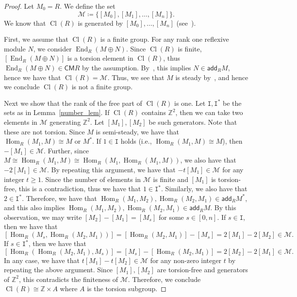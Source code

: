 \documentclass[ALCO,ThmDefs,Unicode]{cedram}
\newcommand{\calM}{\mathcal{M}}
\newcommand{\ZZ}{\mathbb{Z}}
\newcommand{\ttI}{\mathtt{I}}
\DeclareMathOperator{\Hom}{Hom}
\DeclareMathOperator{\Cl}{Cl}
\DeclareMathOperator{\End}{End}
\newcommand{\add}{\mathsf{add}}
\newcommand{\CM}{\mathsf{CM}}
\newcommand*{\MK}{\mkern 2mu}
\begin{document}
\begin{proof}
Let $M_0=R$. We define the set
\[
\calM\coloneqq\{  [M_0], [M_1],\dots, [M_n] \}.
\]
We know that $\Cl(R)$ is generated by $[M_0],\dots,[M_n]$ (see~\cite[Proposition~2.8$\MK$(a)]{IN}).

First, we assume that $\Cl(R)$ is a finite group. For any rank one reflexive module $N$, we consider $\End_R(M\oplus N)$. Since $\Cl(R)$ is finite, $[\End_R(M\oplus N)]$ is a torsion element in $\Cl(R)$, thus $\End_R(M\oplus N)\in\CM R$ by the assumption. By~\cite[Proposition~4.5]{IW2}, this implies $N\in\add_RM$, hence we have that $\Cl(R)=\calM$. Thus, we see that $M$ is steady by~\cite[Theorem~3.1]{IN}, and hence we conclude $\Cl(R)$ is not a finite group.

Next we show that the rank of the free part of $\Cl(R)$ is one. Let $\ttI, \ttI^*$ be the sets as in Lemma~\ref{number_lem}. If $\Cl(R)$ contains $\ZZ^2$, then we can take two elements in $\calM$ generating $\ZZ^2$. Let $[M_1], [M_2]$ be such generators. Note that these are not torsion. Since $M$ is semi-steady, we have that $\Hom_R(M_1,M)\cong M$ or $M^*$. If $1\in\ttI$ holds (i.e., $\Hom_R(M_1,M)\cong M$), then $-[M_1]\in\calM$. Further, since $M\cong\Hom_R(M_1,M)\cong\Hom_R(M_1,\Hom_R(M_1,M))$, we also have that $-2[M_1]\in\calM$. By repeating this argument, we have that $-t[M_1]\in\calM$ for any integer $t\ge 1$. Since the number of elements in $\calM$ is finite and $[M_1]$ is torsion-free, this is a contradiction, thus we have that $1\in\ttI^*$. Similarly, we also have that $2\in\ttI^*$. Therefore, we have that $\Hom_R(M_1,M_2), \Hom_R(M_2,M_1)\in\add_RM^*$, and this also implies $\Hom_R(M_1,M_2), \Hom_R(M_2,M_1)\in\add_RM$. By this observation, we may write $[M_2]-[M_1]=[M_s]$ for some $s\in[0,n]$. If $s\in\ttI$, then we have that
\[
[\Hom_R(M_s,\Hom_R(M_2,M_1))]=[\Hom_R(M_2,M_1)]-[M_s]=2[M_1]-2[M_2]\in\calM.
\]
If $s\in\ttI^*$, then we have that
\[
[\Hom_R(\Hom_R(M_2,M_1),M_s)]=[M_s]-[\Hom_R(M_2,M_1)]=2[M_2]-2[M_1]\in\calM.
\]
In any case, we have that $t[M_1]-t[M_2]\in\calM$ for any non-zero integer $t$ by repeating the above argument. Since $[M_1], [M_2]$ are torsion-free and generators of $\ZZ^2$, this contradicts the finiteness of $\calM$. Therefore, we conclude $\Cl(R)\cong\ZZ\times A$ where $A$ is the torsion subgroup.


\end{proof}
\end{document}
